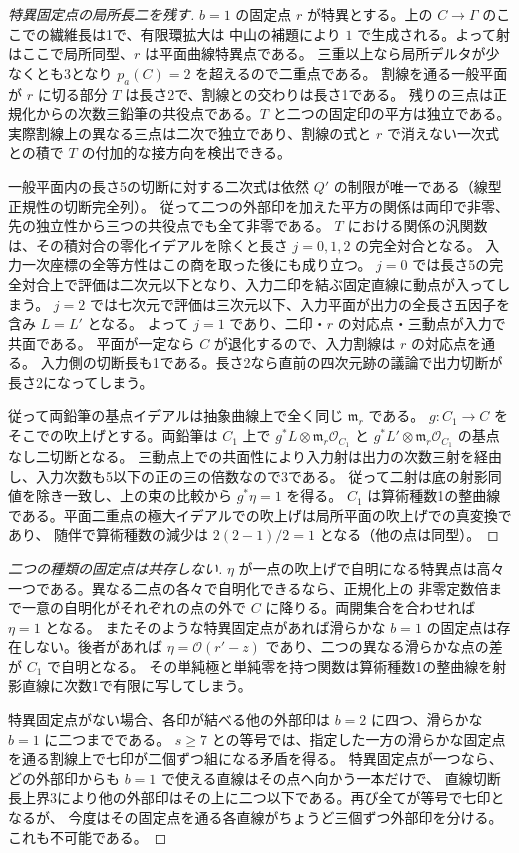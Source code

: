 \begin{proof}[特異固定点の局所長二を残す]
$b=1$ の固定点 $r$ が特異とする。上の $C\to\Gamma$ のここでの繊維長は1で、有限環拡大は
中山の補題により $1$ で生成される。よって射はここで局所同型、$r$ は平面曲線特異点である。
三重以上なら局所デルタが少なくとも3となり $p_a(C)=2$ を超えるので二重点である。
割線を通る一般平面が $r$ に切る部分 $T$ は長さ2で、割線との交わりは長さ1である。
残りの三点は正規化からの次数三鉛筆の共役点である。$T$ と二つの固定印の平方は独立である。
実際割線上の異なる三点は二次で独立であり、割線の式と $r$ で消えない一次式との積で
$T$ の付加的な接方向を検出できる。

一般平面内の長さ5の切断に対する二次式は依然 $Q'$ の制限が唯一である（線型正規性の切断完全列）。
従って二つの外部印を加えた平方の関係は両印で非零、先の独立性から三つの共役点でも全て非零である。
$T$ における関係の汎関数は、その積対合の零化イデアルを除くと長さ $j=0,1,2$ の完全対合となる。
入力一次座標の全等方性はこの商を取った後にも成り立つ。
$j=0$ では長さ5の完全対合上で評価は二次元以下となり、入力二印を結ぶ固定直線に動点が入ってしまう。
$j=2$ では七次元で評価は三次元以下、入力平面が出力の全長さ五因子を含み $L=L'$ となる。
よって $j=1$ であり、二印・$r$ の対応点・三動点が入力で共面である。
平面が一定なら $C$ が退化するので、入力割線は $r$ の対応点を通る。
入力側の切断長も1である。長さ2なら直前の四次元跡の議論で出力切断が長さ2になってしまう。

従って両鉛筆の基点イデアルは抽象曲線上で全く同じ $\mathfrak m_r$ である。
$g:C_1\to C$ をそこでの吹上げとする。両鉛筆は $C_1$ 上で $g^*L\otimes\mathfrak m_r\mathcal O_{C_1}$ と
$g^*L'\otimes\mathfrak m_r\mathcal O_{C_1}$ の基点なし二切断となる。
三動点上での共面性により入力射は出力の次数三射を経由し、入力次数も5以下の正の三の倍数なので3である。
従って二射は底の射影同値を除き一致し、上の束の比較から $g^*\eta=1$ を得る。
$C_1$ は算術種数1の整曲線である。平面二重点の極大イデアルでの吹上げは局所平面の吹上げでの真変換であり、
随伴で算術種数の減少は $2(2-1)/2=1$ となる（他の点は同型）。
\end{proof}
\begin{proof}[二つの種類の固定点は共存しない]
$\eta$ が一点の吹上げで自明になる特異点は高々一つである。異なる二点の各々で自明化できるなら、正規化上の
非零定数倍まで一意の自明化がそれぞれの点の外で $C$ に降りる。両開集合を合わせれば $\eta=1$ となる。
またそのような特異固定点があれば滑らかな $b=1$ の固定点は存在しない。後者があれば
$\eta=\mathcal O(r'-z)$ であり、二つの異なる滑らかな点の差が $C_1$ で自明となる。
その単純極と単純零を持つ関数は算術種数1の整曲線を射影直線に次数1で有限に写してしまう。

特異固定点がない場合、各印が結べる他の外部印は $b=2$ に四つ、滑らかな $b=1$ に二つまでである。
$s\ge7$ との等号では、指定した一方の滑らかな固定点を通る割線上で七印が二個ずつ組になる矛盾を得る。
特異固定点が一つなら、どの外部印からも $b=1$ で使える直線はその点へ向かう一本だけで、
直線切断長上界3により他の外部印はその上に二つ以下である。再び全てが等号で七印となるが、
今度はその固定点を通る各直線がちょうど三個ずつ外部印を分ける。これも不可能である。
\end{proof}
